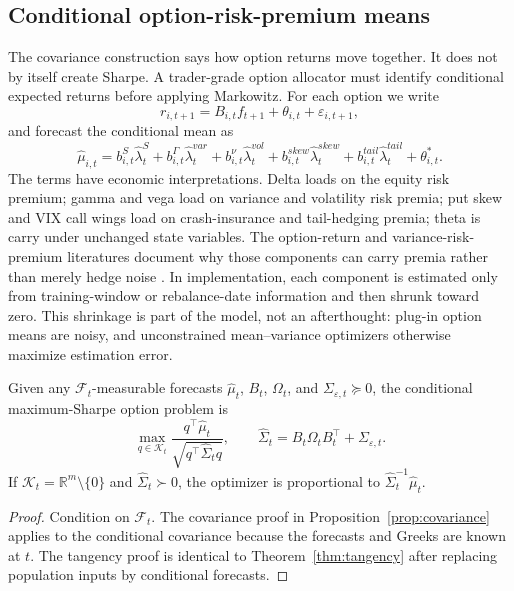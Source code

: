 \subsection{Conditional option-risk-premium means}

The covariance construction says how option returns move together. It does not by itself
create Sharpe. A trader-grade option allocator must identify conditional expected returns
before applying Markowitz. For each option we write
\begin{equation}
 r_{i,t+1}=B_{i,t}f_{t+1}+\theta_{i,t}+\varepsilon_{i,t+1},
\end{equation}
and forecast the conditional mean as
\begin{equation}
\widehat\mu_{i,t}
=
 b^S_{i,t}\widehat\lambda^S_t
+b^\Gamma_{i,t}\widehat\lambda^{var}_t
+b^\nu_{i,t}\widehat\lambda^{vol}_t
+b^{skew}_{i,t}\widehat\lambda^{skew}_t
+b^{tail}_{i,t}\widehat\lambda^{tail}_t
+\theta^\ast_{i,t}.
\label{eq:conditional_mu}
\end{equation}
The terms have economic interpretations. Delta loads on the equity risk premium; gamma
and vega load on variance and volatility risk premia; put skew and VIX call wings load on
crash-insurance and tail-hedging premia; theta is carry under unchanged state variables.
The option-return and variance-risk-premium literatures document why those components can
carry premia rather than merely hedge noise \citep{coval_shumway2001,bakshi_kapadia2003,
carr_wu2009,bollerslev_tauchen_zhou2009,broadie_chernov_johannes2009}. In implementation,
each component is estimated only from training-window or rebalance-date information and
then shrunk toward zero. This shrinkage is part of the model, not an afterthought:
plug-in option means are noisy, and unconstrained mean--variance optimizers otherwise
maximize estimation error.

\begin{proposition}
Given any $\mathcal F_t$-measurable forecasts $\widehat\mu_t$, $B_t$, $\Omega_t$, and
$\Sigma_{\varepsilon,t}\succeq0$, the conditional maximum-Sharpe option problem is
\[
 \max_{q\in\mathcal K_t}
 \frac{q^\top\widehat\mu_t}{\sqrt{q^\top\widehat\Sigma_tq}},
 \qquad
 \widehat\Sigma_t=B_t\Omega_tB_t^\top+\Sigma_{\varepsilon,t}.
\]
If $\mathcal K_t=\mathbb R^m\setminus\{0\}$ and $\widehat\Sigma_t\succ0$, the optimizer is
proportional to $\widehat\Sigma_t^{-1}\widehat\mu_t$.
\end{proposition}

\begin{proof}
Condition on $\mathcal F_t$. The covariance proof in Proposition~\ref{prop:covariance}
applies to the conditional covariance because the forecasts and Greeks are known at $t$.
The tangency proof is identical to Theorem~\ref{thm:tangency} after replacing population
inputs by conditional forecasts.
\end{proof}


